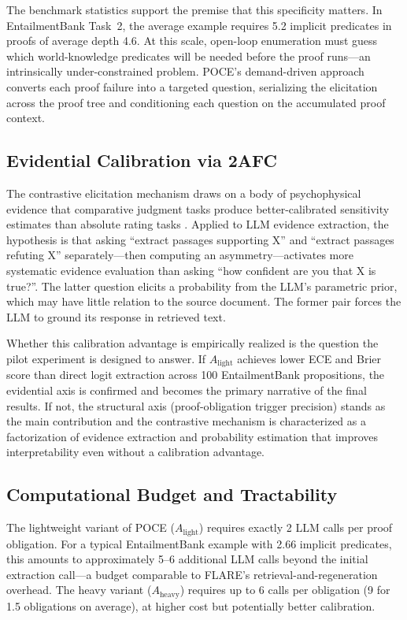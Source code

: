 \documentclass[11pt,letterpaper]{article}
\begin{document}
The benchmark statistics support the premise that this specificity
matters. In EntailmentBank Task~2, the average example requires 5.2 implicit predicates in proofs of average depth 4.6.
At this scale, open-loop enumeration must guess which world-knowledge predicates will be needed before the proof runs---an
intrinsically under-constrained problem. POCE's demand-driven approach converts each proof failure into a targeted question,
serializing the elicitation across the proof tree and conditioning each question on the accumulated proof context.

\subsection{Evidential Calibration via 2AFC}

The contrastive elicitation mechanism draws on a body of psychophysical evidence that
comparative judgment tasks produce better-calibrated sensitivity estimates than absolute rating tasks \citep{Green1966}. Applied to
LLM evidence extraction, the hypothesis is that asking ``extract passages supporting X'' and ``extract passages refuting
X'' separately---then computing an asymmetry---activates more systematic evidence evaluation than asking ``how confident are
you that X is true?''. The latter question elicits a probability from the LLM's parametric prior, which may have little
relation to the source document. The former pair forces the LLM to ground its response in retrieved text.

Whether this calibration advantage is empirically realized is the question the pilot experiment is designed to answer. If $A_\text{light}$ achieves lower ECE and Brier score than direct logit extraction across 100 EntailmentBank propositions, the evidential
axis is confirmed and becomes the primary narrative of the final results. If not, the structural axis (proof-obligation
trigger precision) stands as the main contribution and the contrastive mechanism is characterized as a factorization of
evidence extraction and probability estimation that improves interpretability even without a calibration advantage.

\subsection{Computational Budget and Tractability}

The lightweight variant of POCE ($A_\text{light}$) requires exactly 2 LLM calls per proof obligation. For a typical EntailmentBank example with 2.66 implicit predicates, this amounts to approximately
5--6 additional LLM calls beyond the initial extraction call---a budget comparable to FLARE's retrieval-and-regeneration
overhead. The heavy variant ($A_\text{heavy}$) requires up to 6 calls per obligation (9 for 1.5 obligations on average),
at higher cost but potentially better calibration.
\end{document}
